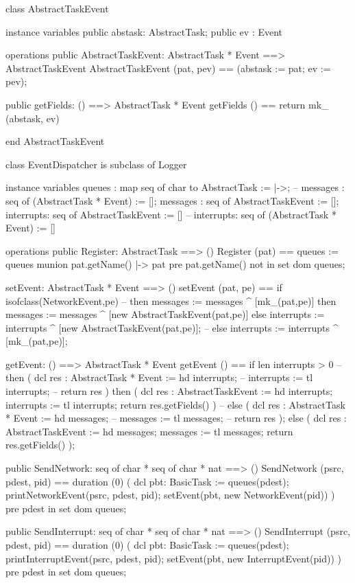 \begin{vdm_al}
class AbstractTaskEvent

instance variables
  public abstask: AbstractTask;
  public ev : Event

operations
  public AbstractTaskEvent: AbstractTask * Event ==> AbstractTaskEvent
  AbstractTaskEvent (pat, pev) == (abstask := pat; ev := pev);

  public getFields: () ==> AbstractTask * Event
  getFields () == return mk_ (abstask, ev)

end AbstractTaskEvent

class EventDispatcher
  is subclass of Logger

instance variables
  queues : map seq of char to AbstractTask := {|->};
  -- messages : seq of (AbstractTask * Event) := [];
  messages : seq of AbstractTaskEvent := [];
  interrupts: seq of AbstractTaskEvent := []
  -- interrupts: seq of (AbstractTask * Event) := []

operations
  public Register: AbstractTask ==> ()
  Register (pat) ==
    queues := queues munion { pat.getName() |-> pat }
    pre pat.getName() not in set dom queues;

  setEvent: AbstractTask * Event ==> ()
  setEvent (pat, pe) == 
    if isofclass(NetworkEvent,pe)
    -- then messages := messages ^ [mk_(pat,pe)]
    then messages := messages ^ [new AbstractTaskEvent(pat,pe)]
    else interrupts := interrupts ^ [new AbstractTaskEvent(pat,pe)];
    -- else interrupts := interrupts ^ [mk_(pat,pe)];

  getEvent: () ==> AbstractTask * Event
  getEvent () ==
    if len interrupts > 0
    -- then ( dcl res : AbstractTask * Event := hd interrupts;
    --        interrupts := tl interrupts;
    --        return res )
    then ( dcl res : AbstractTaskEvent := hd interrupts;
           interrupts := tl interrupts;
           return res.getFields() )
    -- else ( dcl res : AbstractTask * Event := hd messages;
    --        messages := tl messages;
    --        return res );
    else ( dcl res : AbstractTaskEvent := hd messages;
           messages := tl messages;
           return res.getFields() );

  public SendNetwork: seq of char * seq of char * nat ==> ()
  SendNetwork (psrc, pdest, pid) ==
    duration (0)
     ( dcl pbt: BasicTask := queues(pdest);
       printNetworkEvent(psrc, pdest, pid);
       setEvent(pbt, new NetworkEvent(pid)) )
    pre pdest in set dom queues;

  public SendInterrupt: seq of char * seq of char * nat ==> ()
  SendInterrupt (psrc, pdest, pid) ==
    duration (0)
     ( dcl pbt: BasicTask := queues(pdest);
       printInterruptEvent(psrc, pdest, pid);
       setEvent(pbt, new InterruptEvent(pid)) )
    pre pdest in set dom queues;


\end{vdm_al}
